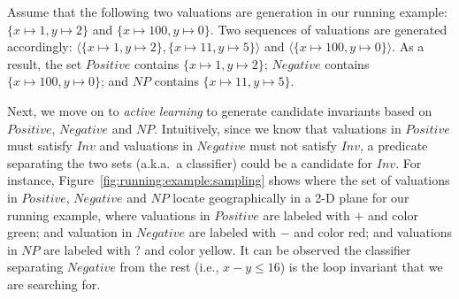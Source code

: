 %
%
\begin{example}
Assume that the following two valuations are generation in our running example: $\{x \mapsto 1, y \mapsto 2\}$ and $\{x \mapsto 100, y \mapsto 0\}$. Two sequences of valuations are generated accordingly: $\langle \{x \mapsto 1, y \mapsto 2\}, \{x \mapsto 11, y \mapsto 5\} \rangle$ and $\langle \{x \mapsto 100, y \mapsto 0\} \rangle$. As a result, the set $\mathit{Positive}$ contains $\{x \mapsto 1, y \mapsto 2\}$; $\mathit{Negative}$ contains $\{x \mapsto 100, y \mapsto 0\}$; and $\mathit{NP}$ contains $\{x \mapsto 11, y \mapsto 5\}$.
\end{example}
Next, we move on to \emph{active learning} to generate candidate invariants based on $\mathit{Positive}$, $\mathit{Negative}$ and $\mathit{NP}$. Intuitively, since we know that valuations in $\mathit{Positive}$ must satisfy $\mathit{Inv}$ and valuations in $\mathit{Negative}$ must not satisfy $\mathit{Inv}$, a predicate separating the two sets (a.k.a.~a classifier) could be a candidate for $\mathit{Inv}$.
For instance, Figure~\ref{fig:running:example:sampling} shows where the set of valuations in $\mathit{Positive}$, $\mathit{Negative}$ and $\mathit{NP}$ locate geographically in a 2-D plane for our running example, where valuations in $\mathit{Positive}$ are labeled with $+$ and color green; and valuation in $\mathit{Negative}$ are labeled with $-$ and color red; and valuations in $\mathit{NP}$ are labeled with ? and color yellow. It can be observed the classifier separating $\mathit{Negative}$ from the rest (i.e., $x - y \leq 16$) is the loop invariant that we are searching for.

